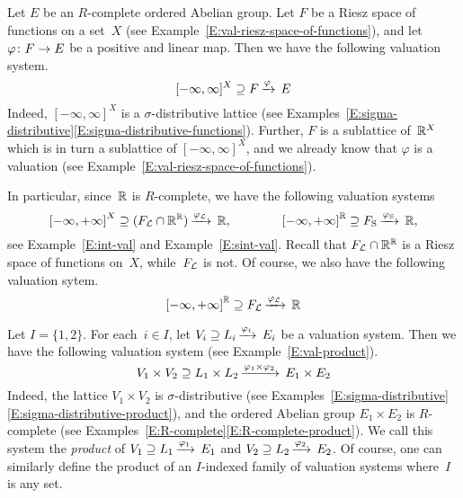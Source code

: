 \documentclass[main.tex]{subfiles}
\begin{document}
%
%
\begin{ex}
\label{E:riesz-function-space-simple-system}
Let $E$ be an $R$-complete ordered Abelian group.
Let $F$ be a Riesz space of functions on a set~$X$
(see Example~\ref{E:val-riesz-space-of-functions}),
and let $\varphi\colon F\rightarrow E$ be a positive and linear map.
Then we have the following  valuation system.
\begin{equation*}
[-\infty,\infty]^X \supseteq F\,\smash{\xrightarrow{\varphi}\,E}
\end{equation*}
Indeed, 
$[-\infty,\infty]^X$ is a $\sigma$-distributive
lattice 
(see Examples~\ref{E:sigma-distributive}\ref{E:sigma-distributive-functions}).
Further, $F$ is a sublattice of~$\mathbb{R}^X$
which is in turn a sublattice of $[-\infty,\infty]^X$,
and we already know that
$\varphi$ is a valuation (see Example~\ref{E:val-riesz-space-of-functions}).

In particular, since~$\mathbb{R}$ is $R$-complete,
we have the following valuation systems
\begin{equation*}
{[-\infty,+\infty]}^X \supseteq (F_{\mathcal{L}}\cap\mathbb{R}^{\mathbb{R}})\,\smash{\xrightarrow{\varphi_{\mathcal{L}}}\,\mathbb{R}},
\qquad\qquad
{[-\infty,+\infty]}^{\mathbb{R}} \supseteq F_{\mathrm{S}}\,\smash{\xrightarrow{\varphi_{\mathrm{S}}}\,\mathbb{R}},
\end{equation*}
see Example~\ref{E:int-val} and Example~\ref{E:sint-val}.
Recall that $F_{\mathcal{L}}\cap \mathbb{R}^{\mathbb{R}}$ is a Riesz space of functions on~$X$,
while~$F_{\mathcal{L}}$ is not.
Of course,
we also have the following valuation sytem.
\begin{equation*}
{[-\infty,+\infty]}^{\mathbb{R}} \supseteq F_{\mathcal{L}}\,\smash{\xrightarrow{\varphi_{\mathcal{L}}}\,\mathbb{R}}
\end{equation*}
\end{ex}

\begin{ex}
Let $I=\{1,2\}$.
For each~$i\in I$,
let $V_i \supseteq L_i\,\smash{\xrightarrow{\varphi_i}\,E_i}$
be a  valuation system.
Then we have the following  valuation system
(see Example~\ref{E:val-product}).
\begin{equation*}
V_1\times V_2 \supseteq L_1 \times L_2\,\smash{\xrightarrow{\varphi_1 \times \varphi_2}\,E_1 \times E_2}
\end{equation*}
Indeed,
the lattice
$V_1\times V_2$ is $\sigma$-distributive
(see Examples~\ref{E:sigma-distributive}\ref{E:sigma-distributive-product}),
and the ordered Abelian group $E_1\times E_2$ is $R$-complete
(see Examples~\ref{E:R-complete}\ref{E:R-complete-product}).
We call this system
the \emph{product} of $V_1 \supseteq L_1\,\smash{\xrightarrow{\varphi_1}\,E_1}$
and $V_2 \supseteq L_2\,\smash{\xrightarrow{\varphi_2}\,E_2}$.
Of course,
one can similarly define the product of 
an $I$-indexed family of valuation systems
where~$I$ is any set.
\end{ex}
\end{document}
